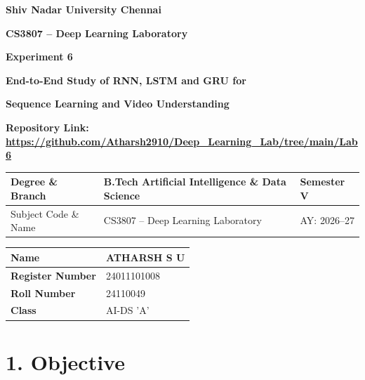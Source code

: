 \documentclass[10pt]{article}
\begin{document}

\begin{center}

{\large\textbf{Shiv Nadar University Chennai}}

\vspace{2mm}

{\normalsize\textbf{CS3807 -- Deep Learning Laboratory}}

\vspace{2mm}

{\large\textbf{Experiment 6}}

\vspace{1mm}

{\normalsize\textbf{End-to-End Study of RNN, LSTM and GRU for}}

{\normalsize\textbf{Sequence Learning and Video Understanding}}

\end{center}

\textbf{Repository Link:}
\textbf{\url{https://github.com/Atharsh2910/Deep_Learning_Lab/tree/main/Lab6}
}


\vspace{3mm}

\begin{tabular}{|p{3.8cm}|p{8cm}|p{2cm}|}
\hline
Degree \& Branch & B.Tech Artificial Intelligence \& Data Science & Semester V\\ \hline
Subject Code \& Name & CS3807 -- Deep Learning Laboratory & AY: 2026--27\\ \hline
\end{tabular}

\begin{tabular}{|p{3.5cm}|p{8cm}|}
\hline
\textbf{Name} & {ATHARSH S U}\\ \hline
\textbf{Register Number} &{24011101008} \\ \hline
\textbf{Roll Number} &{24110049} \\ \hline
\textbf{Class} & {AI-DS 'A'}\\ \hline
\end{tabular}
\vspace{3mm}

\section*{1. Objective}
\end{document}

